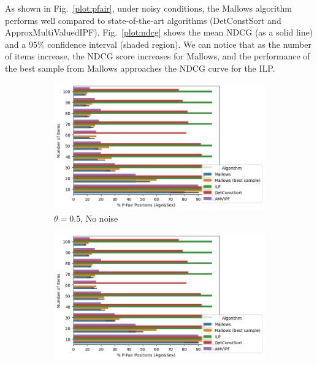 As shown in Fig.~\ref{plot:pfair}, under noisy conditions, the Mallows algorithm performs well compared to state-of-the-art algorithms (DetConstSort and ApproxMultiValuedIPF).
Fig.~\ref{plot:ndcg} shows the mean NDCG (as a solid line) and a 95\% confidence interval (shaded region). We can notice that as the number of items increase, the NDCG score increases for Mallows, and the performance of the best sample from Mallows approaches the NDCG curve for the ILP.


\begin{figure}
     \centering
     \begin{subfigure}{0.4\textwidth}
         \centering
         \includegraphics[width=\textwidth]{resources/00/p_pfair.png}
         \caption{$\theta = 0.5$, No noise}
         \label{fig:00pfair}
     \end{subfigure}\quad
     \begin{subfigure}{0.4\textwidth}
         \centering
         \includegraphics[width=\textwidth]{resources/10/p_pfair.png}

\end{subfigure}
\end{figure}

